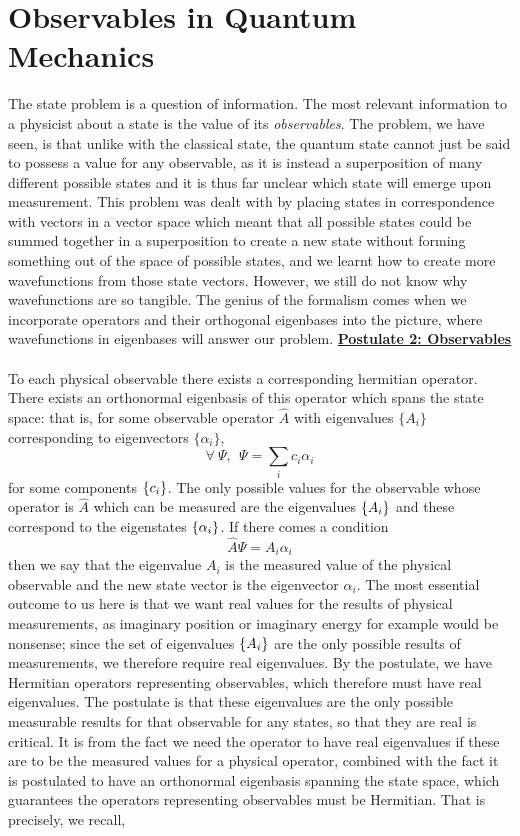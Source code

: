 \section{Observables in Quantum Mechanics}
The state problem is a question of information. The most relevant information to a physicist about a state is the value of its \textit{observables}. The problem, we have seen, is that unlike with the classical state, the quantum state cannot just be said to possess a value for any observable, as it is instead a superposition of many different possible states and it is thus far unclear which state will emerge upon measurement. This problem was dealt with by placing states in correspondence with vectors in a vector space which meant that all possible states could be summed together in a superposition to create a new state without forming something out of the space of possible states, and we learnt how to create more  wavefunctions from those state vectors. However, we still do not know why wavefunctions are so tangible. The genius of the formalism comes when we incorporate operators and their orthogonal eigenbases into the picture, where wavefunctions in eigenbases will answer our problem.
\Answer
\underline{\textbf{Postulate 2: Observables}}\\\\
To each physical observable there exists a corresponding hermitian operator. There exists an orthonormal eigenbasis of this operator which spans the state space: that is, for some observable operator $\hat{A}$ with eigenvalues $\{A_{i}\}$ corresponding to eigenvectors $\{\alpha_{i}\}$,
$$
\forall\:\Psi, \:\: \Psi=\sum_{i}c_{i}\alpha_{i}
$$
for some components $\{c_{i}\}$. The only possible values for the observable whose operator is $\hat{A}$ which can be measured are the eigenvalues $\{A_{i}\}$ and these correspond to the eigenstates $\{\alpha_{i}\}$. If there comes a condition 
$$
\hat{A}\Psi=A_{i}\alpha_{i}
$$
then we say that the eigenvalue $A_{i}$ is the measured value of the physical observable and the new state vector is the eigenvector $\alpha_{i}$. 
\Answerend
The most essential outcome to us here is that we want real values for the results of physical measurements, as imaginary position or imaginary energy for example would be nonsense; since the set of eigenvalues $\{A_{i}\}$ are the only possible results of measurements, we therefore require real eigenvalues. By the postulate, we have Hermitian operators representing observables, which therefore must have real eigenvalues. The postulate is that these eigenvalues are the only possible measurable results for that observable for any states, so that they are real is critical. It is from the fact we need the operator to have real eigenvalues if these are to be the measured values for a physical operator, combined with the fact it is postulated to have an orthonormal eigenbasis spanning the state space, which guarantees the operators representing observables must be Hermitian. That is precisely, we recall,
